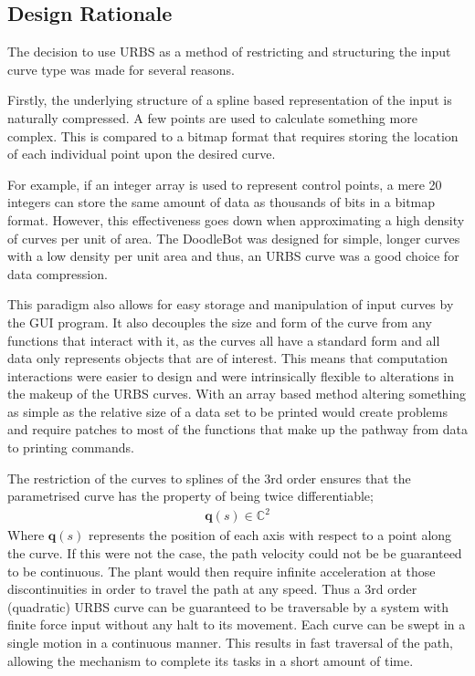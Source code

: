 \subsection{Design Rationale}

The decision to use URBS as a method of restricting and structuring the input curve type was made for several reasons. 

Firstly, the underlying structure of a spline based representation of the input is naturally compressed. A few points are used to calculate something more complex. This is compared to a bitmap format that requires storing the location of each individual point upon the desired curve. 

For example, if an integer array is used to represent control points, a mere 20 integers can store the same amount of data as thousands of bits in a bitmap format. However, this effectiveness goes down when approximating a high density of curves per unit of area. The DoodleBot was designed for simple, longer curves with a low density per unit area and thus, an URBS curve was a good choice for data compression. 

This paradigm also allows for easy storage and manipulation of input curves by the GUI program. It also decouples the size and form of the curve from any functions that interact with it, as the curves all have a standard form and all data only represents objects that are of interest. This means that computation interactions were easier to design and were intrinsically flexible to alterations in the makeup of the URBS curves. With an array based method altering something as simple as the relative size of a data set to be printed would create problems and require patches to most of the functions that make up the pathway from data to printing commands.

The restriction of the curves to splines of the 3rd order ensures that the parametrised curve has the property of being twice differentiable;
\begin{align*}
\textbf{q}(s) \in \mathbb{C}^2
\end{align*}
Where $\textbf{q}(s)$ represents the position of each axis with respect to a point along the curve.
If this were not the case, the path velocity could not be be guaranteed to be continuous. The plant would then require infinite acceleration at those discontinuities in order to travel the path at any speed. Thus a 3rd order (quadratic) URBS curve can be guaranteed to be traversable by a system with finite force input without any halt to its movement. Each curve can be swept in a single motion in a continuous manner. This results in fast traversal of the path, allowing the mechanism to complete its tasks in a short amount of time.

